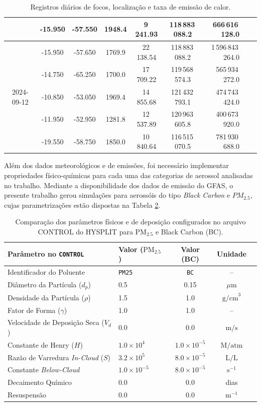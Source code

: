\begin{table}[htbp]
\begin{tabular}{ccccccrcc}
			 & -15.950 & -57.550 & 1948.4 & 9\,241.93  & 118\,883\,088.2 & 666\,616\,128.0 \\
			\midrule
			 & -15.950 & -57.650 & 1769.9 & 22\,138.54 & 118\,883\,088.2 & 1\,596\,843\,264.0 \\
			\multirow{3}{*}{2024-09-12} & -14.750 & -65.250 & 1700.0 & 17\,709.22 & 119\,568\,574.3 & 565\,934\,272.0 \\
			 & -10.850 & -53.050 & 1969.4 & 14\,855.68 & 121\,432\,793.1 & 474\,743\,424.0 \\
			 & -11.950 & -52.950 & 1281.8 & 12\,537.89 & 120\,963\,605.8 & 400\,673\,920.0 \\
			 & -19.550 & -58.750 & 1850.0 & 10\,840.64 & 116\,515\,070.5 & 781\,930\,688.0 \\
			\bottomrule
		\end{tabular}
		\caption{Registros diários de focos, localização e taxa de emissão de calor.}
		\label{table:dados_focos}
	\end{table}
	
	Além dos dados meteorológicos e de emissões, foi necessário implementar propriedades físico-químicas para cada uma das categorias de aerossol analisadas no trabalho. Mediante a disponibilidade dos dados de emissão do GFAS, o presente trabalho gerou simulações para aerossóis do tipo \textit{Black Carbon} e $PM_{2.5}$, cujas parametrizações estão dispostas na Tabela \ref{table:fsc_qmc}.
	
	\begin{table}[htbp]
		\centering
		\begin{tabular}{llccc}
			\toprule
			\textbf{Parâmetro no \texttt{CONTROL}}  & \textbf{Valor ($\text{PM}_{2.5}$)} & \textbf{Valor (BC)} & \textbf{Unidade} \\
			\midrule
			Identificador do Poluente  & \texttt{PM25} & \texttt{BC} & -- \\
			Diâmetro da Partícula  ($d_p$) & 0.5 & 0.15 & $\mu\text{m}$ \\
			Densidade da Partícula  ($\rho$) & 1.5 & 1.0 & $\text{g/cm}^3$ \\
			Fator de Forma  ($\gamma$) & 1.0 & 1.0 & -- \\
			Velocidade de Deposição Seca  ($V_d$) & 0.0 & 0.0 & $\text{m/s}$ \\
			Constante de Henry  ($H$) & $1.0 \times 10^{4}$ & $1.0 \times 10^{-5}$ & $\text{M/atm}$ \\
			Razão de Varredura \emph{In-Cloud}  ($S$) & $3.2 \times 10^{5}$ & $8.0 \times 10^{-5}$ & $\text{L/L}$ \\
			Constante \emph{Below-Cloud}  & $1.0 \times 10^{-5}$ & $8.0 \times 10^{-5}$ & $\text{s}^{-1}$ \\
			Decaimento Químico  & 0.0 & 0.0 & dias \\
			Resuspensão  & 0.0 & 0.0 & $\text{m}^{-1}$ \\
			\bottomrule
		\end{tabular}
		\caption{Comparação dos parâmetros físicos e de deposição configurados no arquivo CONTROL do HYSPLIT para $\text{PM}_{2.5}$ e Black Carbon (BC).}
		\label{table:fsc_qmc}
	\end{table}
	
